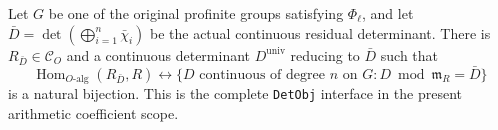 \begin{theorem}
\label{claim:KX7}
Let $G$ be one of the original profinite groups satisfying
$\Phi_\ell$, and let
$\bar D=\det(\bigoplus_{i=1}^n\bar\chi_i)$ be the actual
continuous residual determinant.  There is
$R_{\bar D}\in\mathcal C_O$ and a continuous determinant
$D^{\mathrm{univ}}$ reducing to $\bar D$ such that
\[
 \operatorname{Hom}_{O\text{-alg}}(R_{\bar D},R)
       \longleftrightarrow
 \{D\text{ continuous of degree }n\text{ on }G:
                                      D\bmod\mathfrak m_R=\bar D\}
                                                               \tag{KX.14}
\]
is a natural bijection.  This is the complete \texttt{DetObj}
interface in the present arithmetic coefficient scope.
\end{theorem}
